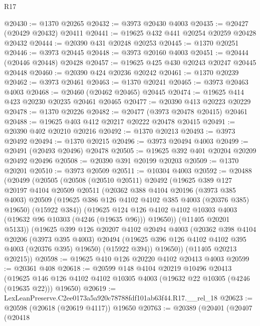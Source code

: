 \begin{lexlean}{R17}
\begin{coremodule}
@20430 := @1370 @20265
@20432 := @3973 @20430 @4003
@20435 := @20427 (@20429 @20432) @20411
@20441 := @19625 @432 @441 @20254 @20259 @20428 @20432
@20444 := @20390 @431 @20248 @20253
@20445 := @1370 @20251
@20446 := @3973 @20445
@20448 := @3973 @20160 @4003
@20451 := @20444 (@20446 @20448) @20428
@20457 := @19625 @425 @430 @20243 @20247 @20445 @20448
@20460 := @20390 @424 @20236 @20242
@20461 := @1370 @20239
@20462 := @3973 @20461
@20463 := @1370 @20241
@20465 := @3973 @20463 @4003
@20468 := @20460 (@20462 @20465) @20445
@20474 := @19625 @414 @423 @20230 @20235 @20461 @20465
@20477 := @20390 @413 @20223 @20229
@20478 := @1370 @20226
@20482 := @20477 (@3973 @20478 @20415) @20461
@20488 := @19625 @403 @412 @20217 @20222 @20478 @20415
@20491 := @20390 @402 @20210 @20216
@20492 := @1370 @20213
@20493 := @3973 @20492
@20494 := @1370 @20215
@20496 := @3973 @20494 @4003
@20499 := @20491 (@20493 @20496) @20478
@20505 := @19625 @392 @401 @20204 @20209 @20492 @20496
@20508 := @20390 @391 @20199 @20203
@20509 := @1370 @20201
@20510 := @3973 @20509
@20511 := @10304 @4003
@20592 := @20488
    (@20499
      (@20505
        (@20508
          (@20510 @20511)
          @20492
          (@19625
            @389
            @127
            @20197
            @4104
            @20509
            @20511
            (@20362
              @388
              @4104
              @20196
              (@3973 @385 @4003)
              @20509
              (@19625 @386 @126 @4102 @4102 @385 @4003 (@20376 @385) @19650)
              (@15922 @384))
            (@19625
              @124
              @126
              @4102
              @4102
              @10303
              @4003
              (@19632 @96 @10303 (@4246 (@19635 @96)))
              @19650))
          (@11405 @20201 @5133))
        (@19625
          @399
          @126
          @20207
          @4102
          @20494
          @4003
          (@20362
            @398
            @4104
            @20206
            (@3973 @395 @4003)
            @20494
            (@19625 @396 @126 @4102 @4102 @395 @4003 (@20376 @395) @19650)
            (@15922 @394))
          @19650))
      (@11405 @20213 @20215))
@20598 := @19625 @410 @126 @20220 @4102 @20413 @4003
@20599 := @20361 @408
@20618 := @20599
    @148
    @4104
    @20219
    @10496
    @20413
    (@19625 @146 @126 @4102 @4102 @10305 @4003 (@19632 @22 @10305 (@4246 (@19635 @22))) @19650)
@20619 := LexLeanPreserve.C2ee0173a5a920c78788fdf101ab63f44.R17.__rel_18
@20623 := @20598 (@20618 (@20619 @4117)) @19650
@20763 := @20389
    (@20401
      (@20407
        (@20418

\end{coremodule}
\end{lexlean}
